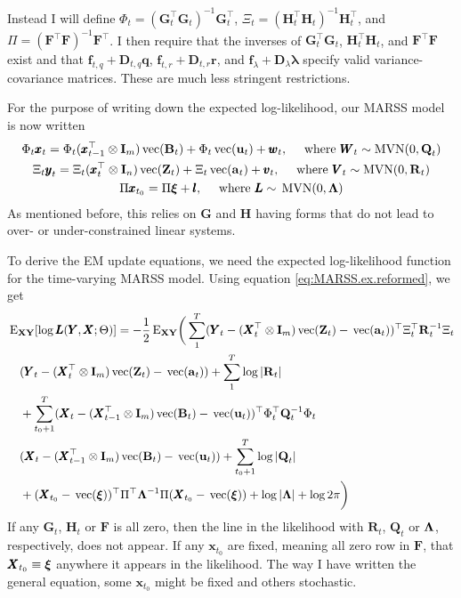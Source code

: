 \documentclass[]{article}
\def\llambda{\pmb{\lambda}}
\def\xixi{\mbox{\boldmath $\xi$}}
\def\LAM{\mbox{\boldmath $\Lambda$}}
\def\ZZ{\mbox{$\mathbf Z$}}	\def\zz{\mbox{$\mathbf z$}}
\def\BB{\mbox{$\mathbf B$}}	\def\bb{\mbox{$\mathbf b$}}
\def\DD{\mbox{$\mathbf D$}}	\def\dd{\mbox{$\mathbf d$}}
\def\FF{\mbox{$\mathbf F$}} \def\ff{\mbox{$\mathbf f$}}
\def\GG{\mbox{$\mathbf G$}}	\def\gg{\mbox{$\mathbf g$}}
\def\HH{\mbox{$\mathbf H$}}	\def\hh{\mbox{$\mathbf h$}}
\def\II{\mbox{$\mathbf I$}} \def\ii{\mbox{$\mathbf i$}}
\def\QQ{\mbox{$\mathbf Q$}}	 \def\qq{\mbox{$\mathbf q$}}
\def\RR{\mbox{$\mathbf R$}}	 \def\rr{\mbox{$\mathbf r$}}
\def\VV{\mbox{$\pmb{V}$}}	\def\vv{\mbox{$\pmb{v}$}}
\def\WW{\mbox{$\pmb{W}$}}	\def\ww{\mbox{$\pmb{w}$}}
\def\XX{\mbox{$\pmb{X}$}}	\def\xx{\mbox{$\pmb{x}$}}
\def\YY{\mbox{$\pmb{Y}$}}	\def\yy{\mbox{$\pmb{y}$}}
\def\LL{\mbox{$\pmb{L}$}}	\def\ll{\mbox{$\pmb{l}$}}
\def\vec{\,\textup{\textrm{vec}}}
\def\MVN{\,\textup{\textrm{MVN}}}
\def\EXy{\,\textup{\textrm{E}}_{\text{{\bf XY}}}}
\begin{document}
Instead I will define  $\Phi_t=(\GG_t^\top\GG_t)^{-1}\GG_t^\top$, $\Xi_t=(\HH_t^\top\HH_t)^{-1}\HH_t^\top$, and $\Pi = (\FF^\top\FF)^{-1}\FF^\top$. I then require that the inverses of $\GG_t^\top\GG_t$, $\HH_t^\top\HH_t$, and $\FF^\top\FF$ exist and that  $\ff_{t,q}+\DD_{t,q}\qq$, $\ff_{t,r}+\DD_{t,r}\rr$, and $\ff_\lambda+\DD_\lambda\llambda$ specify valid variance-covariance matrices. These are much less stringent restrictions.

For the purpose of writing down the expected log-likelihood, our MARSS model is now written
\begin{equation}\label{eq:MARSS.ex.reformed}
\begin{gathered}
\Phi_t\xx_t = \Phi_t( \xx_{t-1}^\top \otimes \II_m)\vec(\BB_t) + \Phi_t\vec(\uu_t) + \ww_t, \quad
\text{ where } \WW_t \sim \mathrm{MVN}(0,\QQ_t)\\
\Xi_t\yy_t = \Xi_t( \xx_t^\top \otimes \II_n)\vec(\ZZ_t) + \Xi_t\vec(\aa_t) + \vv_t,\quad \text{ where } \VV_t \sim \mathrm{MVN}(0,\RR_t)\\
\Pi\xx_{t_0}=\Pi\xixi+\ll, \quad \text{ where } \LL \sim \MVN(0,\LAM)
\end{gathered}
\end{equation}
As mentioned before, this relies on $\GG$ and $\HH$ having forms that do not lead to over- or under-constrained linear systems.

To derive the EM update equations, we need the expected log-likelihood function for the time-varying MARSS model.  Using equation \ref{eq:MARSS.ex.reformed}, we get
\begin{equation}\label{eq:logL.vec.general}
\begin{split}
&\EXy[\log\LL(\YY,\XX ; \Theta)] = -\frac{1}{2}\EXy\bigg(
 \sum_1^T(\YY_t - ( \XX_t^\top \otimes \II_m)\vec(\ZZ_t) - \vec(\aa_t) )^\top\Xi_t^\top \RR_t^{-1}\Xi_t\\
&\quad (\YY_t-(\XX_t^\top \otimes \II_m)\vec(\ZZ_t) - \vec(\aa_t))+\sum_1^T \log |\RR_t|\\
&\quad +\sum_{t_0+1}^T(\XX_t-(\XX_{t-1}^\top \otimes \II_m)\vec(\BB_t) - \vec(\uu_t) )^\top \Phi_t^\top\QQ_t^{-1}\Phi_t \\
&\quad ( \XX_t-(\XX_{t-1}^\top \otimes \II_m)\vec(\BB_t) - \vec(\uu_t) )+\sum_{t_0+1}^T\log |\QQ_t|\\
&\quad +(\XX_{t_0}-\vec(\xixi))^\top \Pi^\top\LAM^{-1}\Pi (\XX_{t_0}-\vec(\xixi)) + \log |\LAM| + \log 2\pi \bigg)
\end{split}
\end{equation}
If any $\GG_t$, $\HH_t$ or $\FF$ is all zero, then the line in the likelihood with $\RR_t$, $\QQ_t$ or $\LAM$, respectively, does not appear.  If any $\xx_{t_0}$ are fixed, meaning all zero row in $\FF$, that $\XX_{t_0}\equiv\xixi$ anywhere it appears in the likelihood.  The way I have written the general equation, some $\xx_{t_0}$ might be fixed and others stochastic.
\end{document}
